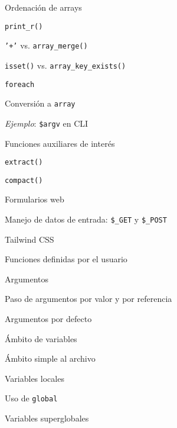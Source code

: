 \begin{longenum}
\begin{longenum}
\begin{longenum}
\begin{longenum}
                \item Ordenación de arrays
                \item \texttt{print\_r()}
                \item \texttt{'+'} vs. \texttt{array\_merge()}
                \item \texttt{isset()} vs. \texttt{array\_key\_exists()}
            \end{longenum}
            \item \texttt{foreach}
            \item Conversión a \texttt{array}
            \item \textit{Ejemplo}: \texttt{\$argv} en CLI
            \item Funciones auxiliares de interés
            \begin{longenum}
                \item \texttt{extract()}
                \item \texttt{compact()}
            \end{longenum}
        \end{longenum}
        \item Formularios web
        \begin{longenum}
            \item Manejo de datos de entrada: \texttt{\$\_GET} y \texttt{\$\_POST}
            \item Tailwind CSS
        \end{longenum}
        \item Funciones definidas por el usuario
        \begin{longenum}
            \item Argumentos
            \begin{longenum}
                \item Paso de argumentos por valor y por referencia
                \item Argumentos por defecto
            \end{longenum}
            \item Ámbito de variables
            \begin{longenum}
                \item Ámbito simple al archivo
                \item Variables locales
                \item Uso de \texttt{global}
                \item Variables superglobales
            \end{longenum}

\end{longenum}
\end{longenum}
\end{longenum}
